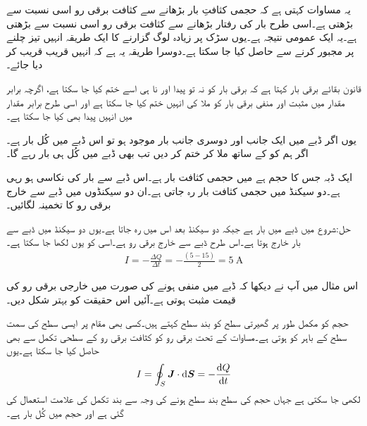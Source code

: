یہ مساوات کہتی ہے کہ حجمی کثافتِ بار بڑھانے سے کثافت برقی رو اسی نسبت سے بڑھتی ہے۔اسی طرح بار کی رفتار بڑھانے سے کثافت برقی رو اسی نسبت سے بڑھتی ہے۔یہ ایک عمومی نتیجہ ہے۔یوں سڑک پر زیادہ لوگ گزارنے کا ایک طریقہ انہیں تیز چلنے پر مجبور کرنے سے حاصل کیا جا سکتا ہے۔دوسرا طریقہ یہ ہے کہ انہیں قریب قریب کر دیا جائے۔ 


قانون بقائے برقی بار کہتا ہے کہ برقی بار کو نہ تو پیدا  اور نا ہی اسے ختم کیا جا سکتا ہے، اگرچہ برابر مقدار میں مثبت اور منفی برقی بار  کو ملا کی انہیں ختم کیا جا سکتا ہے اور اسی طرح برابر مقدار میں انہیں پیدا بھی کیا جا سکتا ہے۔

یوں اگر ڈبے میں ایک جانب  اور دوسری جانب  بار موجود ہو تو اس ڈبے میں کُل  بار ہے۔اگر ہم   کو   کے ساتھ ملا کر ختم کر دیں تب  بھی ڈبے میں کُل  ہی بار رہے گا۔

ایک ڈبہ جس کا حجم  ہے میں حجمی کثافت بار  ہے۔اس ڈبے سے بار کی نکاسی ہو رہی ہے۔دو سیکنڈ میں حجمی کثافت بار  رہ جاتی ہے۔ان دو سیکنڈوں میں ڈبے سے خارج برقی رو کا تخمینہ لگائیں۔

حل:شروع میں ڈبے میں  بار ہے جبکہ دو سیکنڈ بعد اس میں  رہ جاتا ہے۔یوں دو سیکنڈ میں ڈبے سے  بار خارج ہوتا ہے۔اس طرح  ڈبے سے خارج برقی رو  ہے۔اسی کو یوں لکھا جا سکتا ہے۔
\begin{align*}
I=-\frac{\Delta Q}{\Delta t}=-\frac{(5-15)}{2}=\SI{5}{\ampere}
\end{align*}

اس مثال میں آپ نے دیکھا کہ ڈبے میں  منفی ہونے کی صورت میں خارجی برقی رو کی قیمت مثبت ہوتی ہے۔آئیں اس حقیقت کو بہتر شکل دیں۔

حجم کو مکمل طور پر گھیرتی سطح کو بند سطح کہتے ہیں۔کسی بھی مقام پر ایسی سطح کی سمت سطح کے  باہر کو ہوتی ہے۔مساوات  کے تحت برقی رو کو کثافت برقی رو کے سطحی تکمل سے بھی حاصل کیا جا سکتا ہے۔یوں
\begin{align}\label{مساوات_کپیسٹر_استمراری_مساوات_تکمل_شکل}
I=\oint_S \kvec{J} \cdot \dif \kvec{S}=-\frac{\dif Q}{\dif t}
\end{align}
لکھی جا سکتی ہے جہاں حجم کی سطح بند سطح ہونے کی وجہ سے  بند تکمل کی علامت استعمال کی گئی ہے اور  حجم میں کُل بار ہے۔

